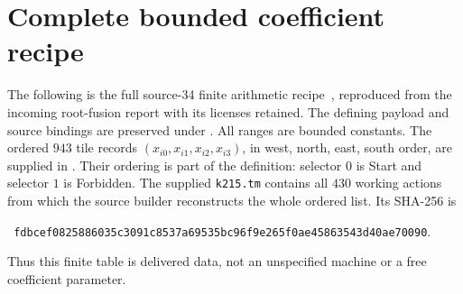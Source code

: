 \section{Complete bounded coefficient recipe}\label{app:coeff}

The following is the full source-34 finite arithmetic recipe~\cite{coeff},
reproduced from the incoming root-fusion report with its licenses retained. The defining payload and source bindings are preserved under .
All ranges are bounded constants. The ordered \(943\) tile records
\((x_{i0},x_{i1},x_{i2},x_{i3})\), in west, north, east, south order,
are supplied in
.
Their ordering is part of the definition: selector \(0\) is Start
and selector \(1\) is Forbidden.
The supplied \texttt{k215.tm} contains all \(430\) working actions
from which the source builder reconstructs the whole ordered list.
Its SHA-256 is
\begin{center}\small\texttt{
fdbcef0825886035c3091c8537a69535bc96f9e265f0ae45863543d40ae70090}.
\end{center}
Thus this finite table is delivered data, not an unspecified machine
or a free coefficient parameter.

